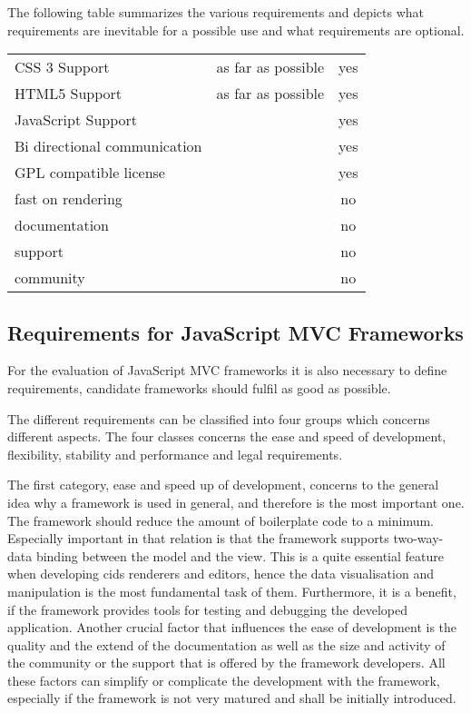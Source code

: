 The following table summarizes the various requirements and depicts what requirements are inevitable for a possible use and what requirements are optional.

\begin{minipage}{\linewidth}
\centering
 \label{tab:req_browser_comp}
\begin{tabulary}{\textwidth}{|l|C|c|}
 \hline 
{}
   &  &  \tabularnewline
 \hline
CSS 3 Support & as far as possible & yes \\
HTML5 Support & as far as possible & yes  \\
JavaScript Support & & yes \\
 Bi directional communication & & yes \\
GPL compatible license & & yes \\ \hline
fast on rendering & & no\\
documentation & & no\\
support & & no \\
community & &no \\
 \hline 
 \end{tabulary}
 \end{minipage}

\subsection{Requirements for JavaScript MVC Frameworks}

For the evaluation of JavaScript MVC frameworks it is also necessary to define requirements, candidate frameworks should fulfil as good as possible.

The different requirements can be classified into four groups which concerns different aspects.
The four classes concerns the ease and speed of development, flexibility,  stability and performance and legal requirements.

The first category, ease and speed up of development, concerns to the general idea why a framework is used in general, and therefore is the most important one.
The framework should reduce the amount of boilerplate code to a minimum.
Especially important in that relation is that the framework supports two-way-data binding between the model and the view.
This is a quite essential feature when developing cids renderers and editors, hence the data visualisation and manipulation is the most fundamental task of them.
Furthermore, it is a benefit, if the framework provides tools for testing and debugging the developed application.
Another crucial factor that influences the ease of development is the quality and the  extend of the documentation as well as the size and activity of the community or the support that is offered by the framework developers.
All these factors can simplify or complicate the development with the framework, especially if the framework is not very matured and shall be initially introduced.

